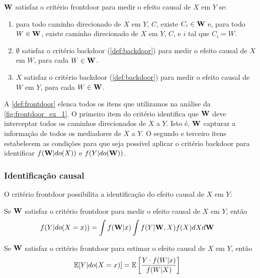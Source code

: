 \begin{definition}
 \label{def:frontdoor}
 ${\mathbf{W}}$ satisfaz o critério frontdoor para
 medir o efeito causal de $X$ em $Y$ se:
 \begin{enumerate}
  \item para todo caminho direcionado de $X$ em $Y$, $C$,
  existe $C_i \in {\mathbf{W}}$ e, para todo $W \in {\mathbf{W}}$,
  existe caminho direcionado de $X$ em $Y$, $C$,
  e $i$ tal que $C_i = W$.
  \item $\emptyset$ satisfaz o critério backdoor 
  (\cref{def:backdoor}) para medir o efeito causal de 
  $X$ em $W$, para cada $W \in {\mathbf{W}}$.
  \item $X$ satisfaz o critério backdoor 
  (\cref{def:backdoor}) para 
  medir o efeito causal de $W$ em $Y$, para cada $W \in {\mathbf{W}}$.
 \end{enumerate}
\end{definition}

A \cref{def:frontdoor} elenca todos os itens que
utilizamos na análise da \cref{fig:frontdoor_ex_1}.
O primeiro item do critério identifica que 
${\mathbf{W}}$ deve interceptar todos os caminhos direcionados
de $X$ a $Y$. Isto é, ${\mathbf{W}}$ capturar 
a informação de todos os mediadores de $X$ a $Y$.
O segundo e terceiro itens estabelecem as condições para que
seja possível aplicar o critério backdoor para 
identificar $f({\mathbf{W}}|do(X))$ e $f(Y|do({\mathbf{W}}))$.

\subsubsection{Identificação causal}

O critério frontdoor possibilita
a identificação do efeito causal de $X$ em $Y$:

\begin{theorem}
 \label{thm:frontdoor}
  Se ${\mathbf{W}}$ satisfaz o critério frontdoor para
  medir o efeito causal de $X$ em $Y$, então
  \begin{align*}
   f(Y|do(X=x))
   &= \int f({\mathbf{W}}|x) \int f(Y|{\mathbf{W}},X)f(X) dX d{\mathbf{W}}
  \end{align*}
\end{theorem}

\begin{theorem}
 \label{thm:frontdoor_ipw}
 Se ${\mathbf{W}}$ satisfaz o critério frontdoor para
 estimar o efeito causal de $X$ em $Y$, então
 \begin{align*}
  {\mathbb E}[Y|do(X=x)]
  &= {\mathbb E}\left[\frac{Y \cdot f(W|x)}{f(W|X)}\right]
 \end{align*}
\end{theorem}

